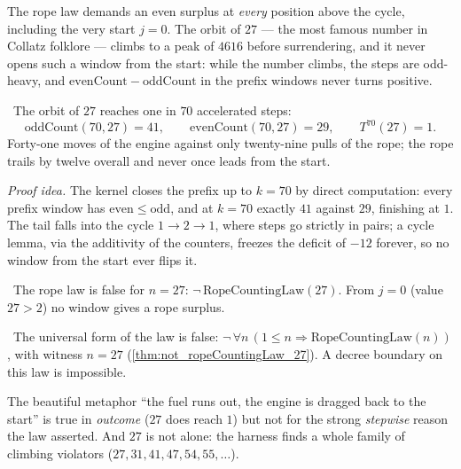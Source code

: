 The rope law demands an even surplus at \emph{every} position above the cycle, including the very
start $j=0$. The orbit of $27$ --- the most famous number in Collatz folklore --- climbs to a peak of
$4616$ before surrendering, and it never opens such a window from the start: while the number climbs,
the steps are odd-heavy, and $\mathrm{evenCount}-\mathrm{oddCount}$ in the prefix windows never turns
positive.

\begin{theorem}\label{thm:counts_at_70_at_27}
\green{}\ The orbit of $27$ reaches one in $70$ accelerated steps:
\begin{equation}\label{eq:counts-27}
\mathrm{oddCount}(70,27)=41,\qquad \mathrm{evenCount}(70,27)=29,\qquad T^{70}(27)=1.
\end{equation}
Forty-one moves of the engine against only twenty-nine pulls of the rope; the rope trails by twelve
overall and never once leads from the start. 
\end{theorem}

\emph{Proof idea.} The kernel closes the prefix up to $k=70$ by direct computation: every prefix window
has $\mathrm{even}\le\mathrm{odd}$, and at $k=70$ exactly $41$ against $29$, finishing at $1$. The tail
falls into the cycle $1\to 2\to 1$, where steps go strictly in pairs; a cycle lemma, via the additivity
of the counters, freezes the deficit of $-12$ forever, so no window from the start ever flips it.

\begin{theorem}\label{thm:not_ropeCountingLaw_27}
\green{}\ The rope law is false for $n=27$: $\neg\,\mathrm{RopeCountingLaw}(27)$. From $j=0$ (value $27>2$)
no window gives a rope surplus. 
\end{theorem}

\begin{theorem}\label{thm:ropeLaw_universal_refuted}
\green{}\ The universal form of the law is false: $\neg\,\forall n\,(1\le n\Rightarrow\mathrm{RopeCountingLaw}(n))$,
with witness $n=27$ (\cref{thm:not_ropeCountingLaw_27}). A decree boundary on this law is impossible.
\end{theorem}

The beautiful metaphor ``the fuel runs out, the engine is dragged back to the start'' is true in
\emph{outcome} ($27$ does reach $1$) but not for the strong \emph{stepwise} reason the law asserted.
And $27$ is not alone: the harness finds a whole family of climbing violators ($27,31,41,47,54,55,\dots$).

